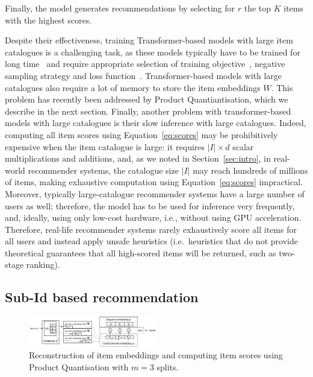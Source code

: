 \documentclass[sigconf,natbib=true, review=true]{acmart} %
\newcommand{\pageenlarge}[1]{\marginnote{}\enlargethispage{#1\baselineskip}}
\newcommand{\sasha}[1]{\textcolor[HTML]{000000}{#1}}
\newcommand{\argmax}{\operatornamewithlimits{\sf argmax}}
\begin{document}
Finally, the model generates recommendations by selecting for $r$ the top $K$ items with the highest scores.%

Despite their effectiveness, training Transformer-based models with large item catalogues is a challenging task, as these models typically have to be trained for long time~\cite{Bert4RecRepro} and require appropriate selection of training objective~\cite{petrovRSSEffectiveEfficient2023}, negative sampling strategy and loss function~\cite{petrovGSASRecReducingOverconfidence2023,klenitskiyTurningDrossGold2023}.
%
Transformer-based models with large catalogues also require a lot of memory to store the item embeddings $W$. This problem has recently been addressed by Product Quantiantisation, which we describe in the next section. 
%
Finally, another problem with transformer-based models with large catalogues is their slow inference with large catalogues. Indeed, computing all item scores using Equation~\eqref{eq:scores} may be prohibitively expensive when the item catalogue is large: it requires $|I|\times d$ scalar multiplications and additions, and, as we noted in Section~\ref{sec:intro},  in real-world recommender systems, the catalogue size $|I|$ may reach hundreds of millions of items, making exhaustive computation using Equation~\eqref{eq:scores} impractical. Moreover, typically large-catalogue recommender systems have a large number of users as well; therefore, the model has to be used for inference very frequently, and, ideally, using only low-cost hardware, i.e., without using GPU acceleration. Therefore, real-life recommender systems rarely exhaustively score all items for all users and instead apply unsafe heuristics (i.e.\ heuristics that do not provide theoretical guarantees that all high-scored items will be returned, such as two-stage ranking). 
 
\subsection{Sub-Id based recommendation}\label{ssec:recjpq}


\begin{figure}[tb]\hspace{-3mm}
    \vspace{-0.5\baselineskip}
\includegraphics[width=0.5\textwidth]{figures/pq_scoring_graffle.pdf}%
    \caption{Reconstruction of item embeddings \sasha{and computing item scores} using Product Quantisation \sasha{with $m=3$ splits.} }\vspace{-.75\baselineskip}
    \label{fig:embedding_reconstruction}
\end{figure}
\end{document}
